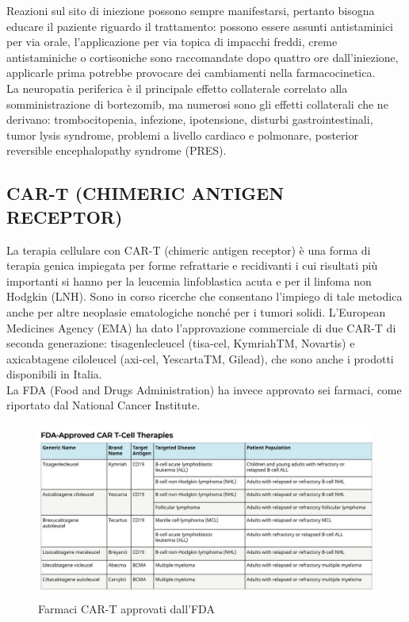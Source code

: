 Reazioni sul sito di iniezione possono sempre manifestarsi, pertanto bisogna educare il paziente riguardo il 
trattamento: possono essere assunti antistaminici per via orale, l’applicazione per via topica di impacchi freddi, 
creme antistaminiche o cortisoniche sono raccomandate dopo quattro ore dall’iniezione, 
applicarle prima potrebbe provocare dei cambiamenti nella farmacocinetica\cite{BORTEZOMIB}.\\
La neuropatia periferica è il principale effetto collaterale correlato alla somministrazione di bortezomib, 
ma numerosi sono gli effetti collaterali che ne derivano: trombocitopenia, infezione, ipotensione, disturbi 
gastrointestinali, tumor lysis syndrome, problemi a livello cardiaco e polmonare, posterior reversible 
encephalopathy syndrome (PRES)\cite{BORTNURSES}.\\ 

\subsection{CAR-T (CHIMERIC ANTIGEN RECEPTOR)}

La terapia cellulare con CAR-T (chimeric antigen receptor) è una forma di terapia genica impiegata per forme 
refrattarie e recidivanti  i cui risultati più importanti si hanno per la leucemia linfoblastica acuta e per il 
linfoma non Hodgkin (LNH). Sono in corso ricerche che consentano l’impiego di tale metodica anche per altre neoplasie 
ematologiche nonché per i tumori solidi.
L’European Medicines Agency (EMA) ha dato l’approvazione commerciale di due CAR-T di seconda generazione: 
tisagenlecleucel (tisa-cel, KymriahTM, Novartis) e axicabtagene ciloleucel (axi-cel, YescartaTM, Gilead), 
che sono anche i prodotti disponibili in Italia\cite{reteveneta}.\\
La FDA (Food and Drugs Administration) ha invece approvato sei farmaci, come 
riportato dal National Cancer Institute\cite{NIHCART}.\\

\begin{figure}[H]
    \begin{center}
    \includegraphics[width=1.0\columnwidth]{img/FDAApprovedCART.jpeg}
    \end{center}
    \caption[Farmaci CAR-T approvati dall’FDA]{Farmaci CAR-T approvati dall’FDA
    \cite{img22}}

\end{figure}

